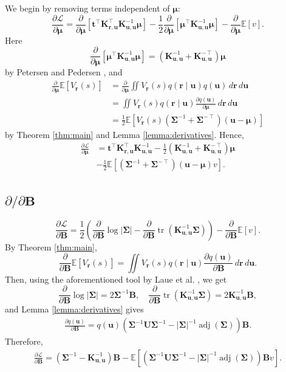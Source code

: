 \documentclass{mpaper}
\DeclareMathOperator{\adj}{adj}
\DeclareMathOperator{\tr}{tr}
\newcommand{\V}{V_{\mathbf{r}}}
\newcommand{\dx}{\,d\mathbf{r}\,d\mathbf{u}}
\newcommand{\Kuu}{\mathbf{K}_{\mathbf{u},\mathbf{u}}}
\newcommand{\Kru}{\mathbf{K}_{\mathbf{r},\mathbf{u}}}
\newcommand{\dm}{\frac{\partial}{\partial\bm\mu}}
\newcommand{\dB}{\frac{\partial}{\partial\mathbf{B}}}
\begin{document}
We begin by removing terms independent of $\bm\mu$:
\[
  \frac{\partial\mathcal{L}}{\partial\bm\mu} =
  \dm[\mathbf{t}^\intercal\Kru^\intercal\Kuu^{-1}\bm\mu] - \frac{1}{2} \dm
  \left[ \bm\mu^\intercal \Kuu^{-1} \bm\mu \right] - \dm\mathbb{E}[v].
\]
Here
\[
  \dm \left[ \bm\mu^\intercal \Kuu^{-1} \bm\mu \right] = (\Kuu^{-1} +
  \Kuu^{-\intercal}) \bm\mu
\]
by Petersen and Pedersen \cite{petersen2008matrix}, and
\[
  \begin{split}
    \dm\mathbb{E}[\V(s)] &= \dm\iint \V(s) q(\mathbf{r} \mid \mathbf{u})
    q(\mathbf{u})\dx \\
    &= \iint \V(s) q(\mathbf{r} \mid \mathbf{u}) \frac{\partial
      q(\mathbf{u})}{\partial \bm\mu}\dx \\
    &= \frac{1}{2}\mathbb{E}[\V(s) (\bm\Sigma^{-1} +
    \bm\Sigma^{-\intercal})(\mathbf{u} - \bm\mu)]
  \end{split}
\]
by Theorem \ref{thm:main} and Lemma \ref{lemma:derivatives}. Hence,
\[
  \begin{split}
    \frac{\partial\mathcal{L}}{\partial\bm\mu} &=
    \mathbf{t}^\intercal\Kru^\intercal\Kuu^{-1} - \frac{1}{2} (\Kuu^{-1} +
    \Kuu^{-\intercal}) \bm\mu \\
    &- \frac{1}{2}\mathbb{E} \left[(\bm\Sigma^{-1} +
      \bm\Sigma^{-\intercal})(\mathbf{u} - \bm\mu) v \right].
  \end{split}
\]

\subsection{\texorpdfstring{$\partial/\partial\mathbf{B}$}{Derivative w.r.t. B}}

\[
  \frac{\partial\mathcal{L}}{\partial\mathbf{B}} =
  \frac{1}{2} \left( \dB\log|\bm\Sigma| - \dB\tr \left( \Kuu^{-1} \bm\Sigma
    \right) \right)
  - \dB\mathbb{E}[v].
\]
By Theorem \ref{thm:main},
\[
  \dB\mathbb{E}[\V(s)] = \iint \V(s) q(\mathbf{r} \mid \mathbf{u})
  \frac{\partial q(\mathbf{u})}{\partial \mathbf{B}}\dx.
\]
Then, using the aforementioned tool by Laue et al.
\cite{DBLP:conf/nips/LaueMG18}, we get
\[
  \dB\log|\bm\Sigma| = 2\bm\Sigma^{-1}\mathbf{B}, \quad \dB \tr \left( \Kuu^{-1}
    \bm\Sigma \right) = 2\Kuu^{-1}\mathbf{B},
\]
and Lemma \ref{lemma:derivatives} gives
\begin{gather*}
  \frac{\partial q(\mathbf{u})}{\partial \mathbf{B}} =
  q(\mathbf{u})(\bm\Sigma^{-1}\mathbf{U}\bm\Sigma^{-1} -
  |\bm\Sigma|^{-1}\adj(\bm\Sigma))\mathbf{B}.
\end{gather*}
Therefore,
\begin{gather*}
  \frac{\partial \mathcal{L}}{\partial \mathbf{B}} =
  \left( \bm\Sigma^{-1} - \Kuu^{-1} \right) \mathbf{B} - \mathbb{E}
  [(\bm\Sigma^{-1}\mathbf{U}\bm\Sigma^{-1} -
  |\bm\Sigma|^{-1}\adj(\bm\Sigma))\mathbf{B}v].
\end{gather*}
\end{document}
